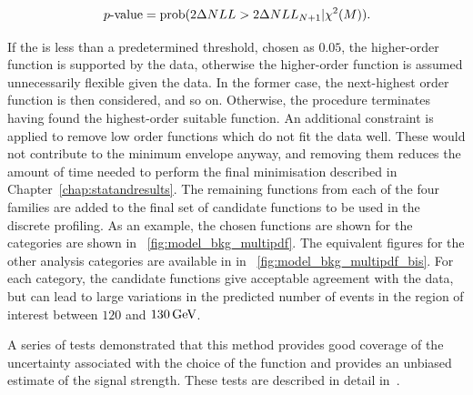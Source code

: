 $$ \text{\ensuremath{\,p{\text{-value}}}} = \text{prob}(2 \Delta NLL > 2 \Delta NLL_{N+1}| \chi^2(M)). $$

If the \pvalue is less than a predetermined threshold, chosen as $0.05$, the higher-order function is supported by the data, otherwise the higher-order function is assumed unnecessarily flexible given the data. In the former case, the next-highest order function is then considered, and so on. Otherwise, the procedure terminates having found the highest-order suitable function. An additional constraint is applied to remove low order functions which do not fit the data well. These would not contribute to the minimum envelope anyway, and removing them reduces the amount of time needed to perform the final minimisation described in Chapter~\ref{chap:statandresults}. The remaining functions from each of the four families are added to the final set of candidate functions to be used in the discrete profiling. As an example, the chosen functions are shown for the \Untagged categories are shown in \Fig~\ref{fig:model_bkg_multipdf}. The equivalent figures for the other analysis categories are available in  in \Fig~\ref{fig:model_bkg_multipdf_bis}. For each category, the candidate functions give acceptable agreement with the data, but can lead to large variations in the predicted number of events in the region of interest between $120$ and $130\,\text{Ge\hspace{-.08em}V}$. %

A series of tests demonstrated that this method provides good coverage of the uncertainty associated with the choice of the function and provides an unbiased estimate of the signal strength. These tests are described in detail in~\cite{DiscreteProfiling}. 

